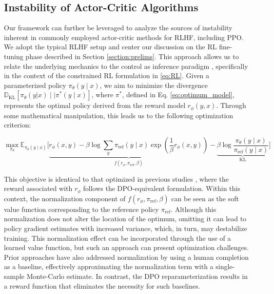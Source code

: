 \subsection{Instability of Actor-Critic Algorithms} Our framework can further be leveraged to analyze the sources of instability inherent in commonly employed actor-critic methods for RLHF, including PPO. We adopt the typical RLHF setup and center our discussion on the RL fine-tuning phase described in Section \ref{section:prelims}. This approach allows us to relate the underlying mechanics to the control as inference paradigm \cite{levine2018reinforcement}, specifically in the context of the constrained RL formulation in \ref{eq:RL}. Given a parameterized policy $\pi_{\theta}(y\mid x)$, we aim to minimize the divergence $\mathbb{D}_{\text{KL}}[\pi_{\theta}(y|x) \mid \mid \pi^*(y\mid x)]$, where $\pi^*$, defined in Eq. \ref{eq:optimum_model}, represents the optimal policy derived from the reward model $r_{\phi}(y, x)$. Through some mathematical manipulation, this leads us to the following optimization criterion:

\begin{equation}\label{eq:AC}
    \max_{\pi_{\theta}}\mathbb{E}_{\pi_{\theta}(y\mid x)}\bigg[\underbrace{r_{\phi}(x, y) -\beta\log\sum_{y}\pi_\text{ref}(y\mid x)\exp\left(\frac{1}{\beta}r_{\phi}(x, y)\right)}_{f(r_{\phi}, \pi_\text{ref}, \beta)} - \underbrace{\beta\log\frac{\pi_{\theta}(y\mid x)}{\pi_\text{ref}(y\mid x)}}_{\text{KL}}\bigg]
\end{equation}

This objective is identical to that optimized in previous studies 
\citep{ziegler2020finetuning, stiennon2022learning, bai2022training, ouyang2022training}, where the reward associated with $r_{\phi}$ follows the DPO-equivalent formulation. Within this context, the normalization component of $f(r_{\phi}, \pi_\text{ref}, \beta)$ can be seen as the soft value function corresponding to the reference policy $\pi_\text{ref}$. Although this normalization does not alter the location of the optimum, omitting it can lead to policy gradient estimates with increased variance, which, in turn, may destabilize training. This normalization effect can be incorporated through the use of a learned value function, but such an approach can present optimization challenges. Prior approaches have also addressed normalization by using a human completion as a baseline, effectively approximating the normalization term with a single-sample Monte-Carlo estimate. In contrast, the DPO reparameterization results in a reward function that eliminates the necessity for such baselines.

